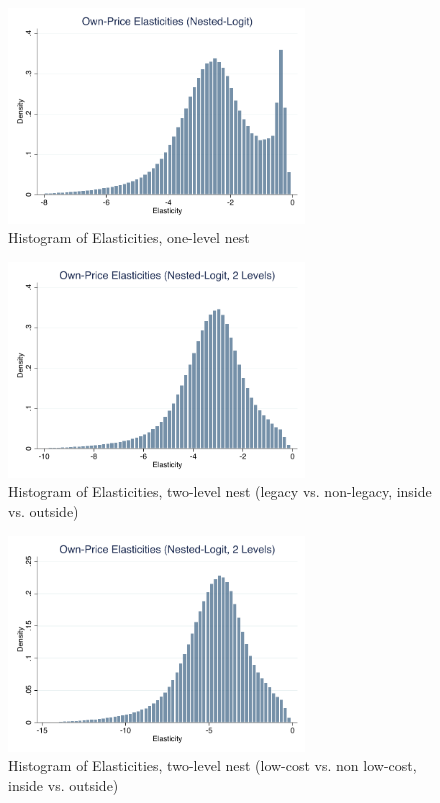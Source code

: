 \documentclass{article}
\begin{document}
\begin{figure}[htbp]
    \centering
    \includegraphics[width=0.7\textwidth]{../src/output/elasticity_logit_histogram_nests_lv1.pdf}
    \caption{Histogram of Elasticities, one-level nest}
\end{figure}

\begin{figure}[htbp]
    \centering
    \includegraphics[width=0.7\textwidth]{../src/output/elasticity_logit_histogram_nests_lv2_legacy.pdf}
    \caption{Histogram of Elasticities, two-level nest (legacy vs. non-legacy, inside vs. outside)}
\end{figure}

\begin{figure}[htbp]
    \centering
    \includegraphics[width=0.7\textwidth]{../src/output/elasticity_logit_histogram_nests_lv2_lcc.pdf}
    \caption{Histogram of Elasticities, two-level nest (low-cost vs. non low-cost, inside vs. outside)}
\end{figure}
\pagebreak
\end{document}
